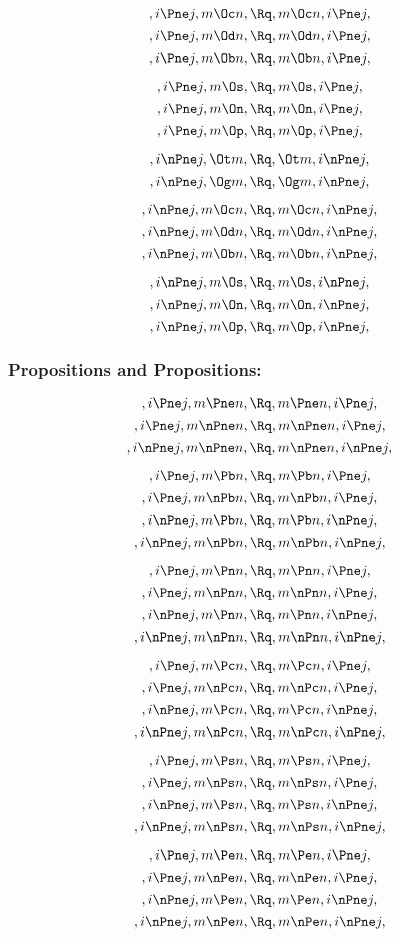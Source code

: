 \[, i \Pne j, m \Oc n, \Rq , m \Oc n, i \Pne j,\]
\[, i \Pne j, m \Od n, \Rq , m \Od n, i \Pne j,\]
\[, i \Pne j, m \Ob n, \Rq , m \Ob n, i \Pne j,\]

\[, i \Pne j, m \Os, \Rq , m \Os, i \Pne j,\]
\[, i \Pne j, m \On, \Rq , m \On, i \Pne j,\]
\[, i \Pne j, m \Op, \Rq , m \Op, i \Pne j,\]

\bigskip
\bigskip
\[, i \nPne j, \Ot m, \Rq , \Ot m, i \nPne j,\]
\[, i \nPne j, \Og m, \Rq , \Og m, i \nPne j,\]

\[, i \nPne j, m \Oc n, \Rq , m \Oc n, i \nPne j,\]
\[, i \nPne j, m \Od n, \Rq , m \Od n, i \nPne j,\]
\[, i \nPne j, m \Ob n, \Rq , m \Ob n, i \nPne j,\]

\[, i \nPne j, m \Os, \Rq , m \Os, i \nPne j,\]
\[, i \nPne j, m \On, \Rq , m \On, i \nPne j,\]
\[, i \nPne j, m \Op, \Rq , m \Op, i \nPne j,\]







\bigskip
\bigskip
\bigskip
\bigskip
\subsubsection{ Propositions and Propositions:}
\[,i \Pne j, m \Pne n, \Rq , m \Pne n, i \Pne j,\]
\[,i \Pne j, m \nPne n, \Rq , m \nPne n, i \Pne j,\]
\[,i \nPne j, m \nPne n, \Rq , m \nPne n, i \nPne j,\]

\[,i \Pne j, m \Pb n, \Rq , m \Pb n, i \Pne j,\]
\[,i \Pne j, m \nPb n, \Rq , m \nPb n, i \Pne j,\]
\[,i \nPne j, m \Pb n, \Rq , m \Pb n, i \nPne j,\]
\[,i \nPne j, m \nPb n, \Rq , m \nPb n, i \nPne j,\]

\[,i \Pne j, m \Pn n, \Rq , m \Pn n, i \Pne j,\]
\[,i \Pne j, m \nPn n, \Rq , m \nPn n, i \Pne j,\]
\[,i \nPne j, m \Pn n, \Rq , m \Pn n, i \nPne j,\]
\[,i \nPne j, m \nPn n, \Rq , m \nPn n, i \nPne j,\]

\[,i \Pne j, m \Pc n, \Rq , m \Pc n, i \Pne j,\]
\[,i \Pne j, m \nPc n, \Rq , m \nPc n, i \Pne j,\]
\[,i \nPne j, m \Pc n, \Rq , m \Pc n, i \nPne j,\]
\[,i \nPne j, m \nPc n, \Rq , m \nPc n, i \nPne j,\]

\[,i \Pne j, m \Ps n, \Rq , m \Ps n, i \Pne j,\]
\[,i \Pne j, m \nPs n, \Rq , m \nPs n, i \Pne j,\]
\[,i \nPne j, m \Ps n, \Rq , m \Ps n, i \nPne j,\]
\[,i \nPne j, m \nPs n, \Rq , m \nPs n, i \nPne j,\]


\[,i \Pne j, m \Pe n, \Rq , m \Pe n, i \Pne j,\]
\[,i \Pne j, m \nPe n, \Rq , m \nPe n, i \Pne j,\]
\[,i \nPne j, m \Pe n, \Rq , m \Pe n, i \nPne j,\]
\[,i \nPne j, m \nPe n, \Rq , m \nPe n, i \nPne j,\]

